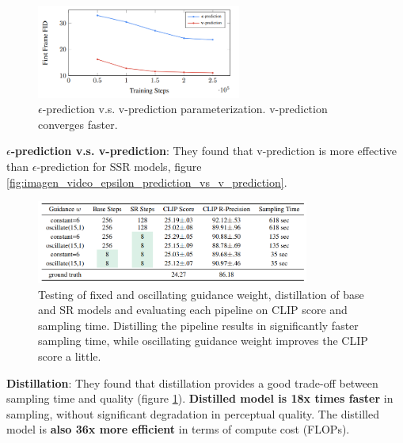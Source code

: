 \begin{figure}
    \centering
    \includegraphics[width=0.6\textwidth]{images/imagen_video/e_prediction_vs_v_prediction_2.png}
    \caption{$\epsilon$-prediction v.s. v-prediction parameterization. v-prediction converges faster.}
\end{figure}

\textbf{$\epsilon$-prediction v.s. v-prediction}: They found that v-prediction is more effective than $\epsilon$-prediction for SSR models, figure \ref{fig:imagen_video_epsilon_prediction_vs_v_prediction}.

\begin{figure}
    \centering
    \includegraphics[width=0.8\textwidth]{images/imagen_video/experiments_table.png}
    \caption{Testing of fixed and oscillating guidance weight, distillation of base and SR models and evaluating each pipeline on CLIP score and sampling time. Distilling the pipeline results in significantly faster sampling time, while oscillating guidance weight improves the CLIP score a little.}
    \label{fig:imagen_video_experiments_table}
\end{figure}

\textbf{Distillation}: They found that distillation provides a good trade-off between sampling time and quality (figure \ref{fig:imagen_video_experiments_table}). \textbf{Distilled model is 18x times faster} in sampling, without significant degradation in perceptual quality. The distilled model is \textbf{also 36x more efficient} in terms of compute cost (FLOPs). 